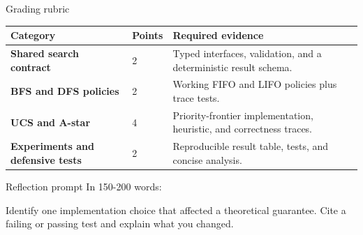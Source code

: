 \documentclass[aspectratio=169,11pt]{beamer}
\begin{document}
\begin{frame}{Grading rubric}
\scriptsize
\begin{tabularx}{\textwidth}{>{\bfseries}p{} p{} X}
\toprule
Category & Points & Required evidence \\
\midrule
Shared search contract & 2 & Typed interfaces, validation, and a deterministic result schema. \\
BFS and DFS policies & 2 & Working FIFO and LIFO policies plus trace tests. \\
UCS and A-star & 4 & Priority-frontier implementation, heuristic, and correctness traces. \\
Experiments and defensive tests & 2 & Reproducible result table, tests, and concise analysis. \\
\bottomrule
\end{tabularx}
\end{frame}

\begin{frame}{Reflection prompt}
In 150-200 words:

Identify one implementation choice that affected a theoretical guarantee. Cite a failing or passing test and explain what you changed.
\end{frame}
\end{document}
